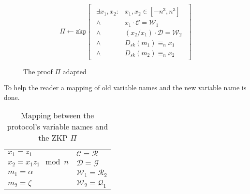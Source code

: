 \begin{figure}[h]
    \begin{table}[H]
      \centering
      \begin{footnotesize}
        \[
        \Pi \leftarrow \texttt{zkp} \begin{bmatrix}\begin{array}{lr}
                                      \exists x_1, x_2 : & x_1, x_2 \in [-n^3, n^3] \\
                                      \land & x_1 \cdot \mathcal{C} = \mathcal{W}_1 \\
                                      \land & (x_2/x_1) \cdot \mathcal{D} = \mathcal{W}_2 \\
                                      \land & D_{sk}(m_1) \equiv_n x_1 \\
                                      \land & D_{sk}(m_2) \equiv_n x_2
                                     \end{array}\end{bmatrix}
        \]
      \end{footnotesize}
    \end{table}

  \caption{The proof $\Pi$ adapted}
  \label{fig:theProofPi}
\end{figure}

To help the reader a mapping of old variable names and the new variable name is done.

\begin{table}[h]
  \begin{tabular}{p{4cm} l}
    $x_1 = z_1$ & $\mathcal{C} = \mathcal{R}$ \\
    $x_2 = x_1z_1 \mod n$ & $\mathcal{D} = \mathcal{G}$ \\
    $m_1 = \alpha$ & $\mathcal{W}_1 = \mathcal{R}_2$ \\
    $m_2 = \zeta$ & $\mathcal{W}_2 = \mathcal{Q}_1$
  \end{tabular}
  \caption{Mapping between the protocol's variable names and the ZKP $\Pi$}
  \label{fig:mappingOfVarNamesPi}
\end{table}

